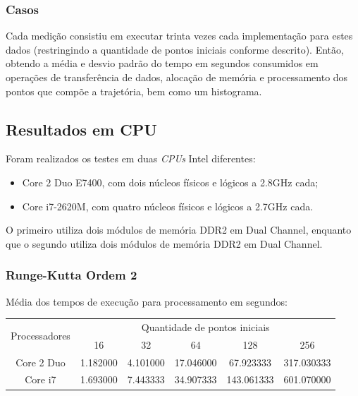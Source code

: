    \subsubsection{Casos}
    Cada medição consistiu em executar trinta vezes cada implementação para estes dados (restringindo a quantidade de pontos iniciais conforme descrito). Então, obtendo a média e desvio padrão do tempo em segundos consumidos em operações de transferência de dados, alocação de memória e processamento dos pontos que compõe a trajetória, bem como um histograma.

  \subsection{Resultados em CPU}
  Foram realizados os testes em duas \textit{CPUs} Intel diferentes:
  \begin{itemize}
    \item Core 2 Duo E7400, com dois núcleos físicos e lógicos a 2.8GHz cada;
    \item Core i7-2620M, com quatro núcleos físicos e lógicos a 2.7GHz cada.
  \end{itemize}
  
  O primeiro utiliza dois módulos de memória DDR2 em Dual Channel, enquanto que o segundo utiliza dois módulos de memória DDR2 em Dual Channel.
    \subsubsection{Runge-Kutta Ordem 2}
    Média dos tempos de execução para processamento em segundos:\\
    \begin{scriptsize}
    \begin{tabular}{| c | c | c | c | c | c |}
      \hline
      \multirow{2}{*}{Processadores}& \multicolumn{5}{|c|}{Quantidade de pontos iniciais} \\ \cline{2-6}
      & 16 & 32 & 64 & 128 & 256 \\ \hline
      Core 2 Duo & 1.182000 & 4.101000 & 17.046000 & 67.923333 & 317.030333 \\ \hline
      Core i7 & 1.693000 & 7.443333 & 34.907333 & 143.061333 & 601.070000\\ \hline

      \hline
    \end{tabular}
    \end{scriptsize}
    \hspace{1mm}\newline
    
